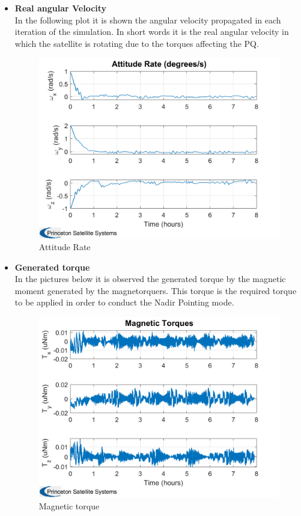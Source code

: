 \begin{itemize}
    \item \textbf{Real angular Velocity}\\
    In the following plot it is shown the angular velocity propagated in each iteration of the simulation. In short
    words it is the real angular velocity in which the satellite is rotating due to the torques affecting the PQ.
    
    \begin{figure}[H]
        \centering
        \includegraphics[width=0.7\linewidth]{res/img/Nadir_no_EKF/Attitude Rate.png}
        \caption{Attitude Rate}
        \label{fig:AttitudeRate}
    \end{figure}

    \item \textbf{Generated torque}\\
    In the pictures below it is observed the generated torque by the magnetic moment generated by the magnetorquers.
    This torque is the required torque to be applied in order to conduct the Nadir Pointing mode.
    \begin{figure}[H]
        \centering
        \includegraphics[width=0.7\linewidth]{res/img/Nadir_no_EKF/Magnetic Torques.png}
        \caption{Magnetic torque}
        \label{fig:Magnetic torque}
    \end{figure}


\end{itemize}
